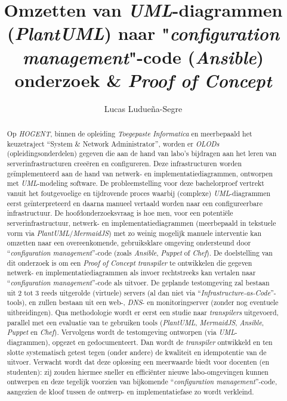 \documentclass{hogent-article}
\title{Omzetten van \emph{UML}-diagrammen (\emph{PlantUML}) naar "\emph{configuration management}"-code (\emph{Ansible})\\\textemdash\space onderzoek \& \emph{Proof of Concept}}
\author{Lucas Ludueña-Segre}
\begin{document}
\begin{abstract}
  Op \emph{HOGENT}, binnen de opleiding \emph{Toegepaste Informatica} en meerbepaald het keuzetraject ``System \& Network Administrator'', worden er \emph{OLODs} (opleidingsonderdelen) gegeven die aan de hand van labo's bijdragen aan het leren van serverinfrastructuren creeëren en configureren. Deze infrastructuren worden geïmplementeerd aan de hand van netwerk- en implementatiediagrammen, ontworpen met \emph{UML}-modeling software. %
  De probleemstelling voor deze bachelorproef vertrekt vanuit het foutgevoelige en tijdrovende proces waarbij (complexe) \emph{UML}-diagrammen eerst geïnterpreteerd en daarna manueel vertaald worden naar een configureerbare infrastructuur.
  De hoofdonderzoeksvraag is hoe men, voor een potentiële serverinfrastructuur, netwerk- en implementatiediagrammen (meerbepaald in tekstuele vorm via \emph{PlantUML}/\emph{MermaidJS}) met zo weinig mogelijk manuele interventie kan omzetten naar een overeenkomende, gebruiksklare omgeving ondersteund door ``\emph{configuration management}''-code (zoals \emph{Ansible}, \emph{Puppet} of \emph{Chef}).
  De doelstelling van dit onderzoek is om een \emph{Proof of Concept} \emph{transpiler} te ontwikkelen die gegeven netwerk- en implementatiediagrammen als invoer rechtstreeks kan vertalen naar ``\emph{configuration management}''-code als uitvoer.
  De geplande testomgeving zal bestaan uit 2 tot 3 reeds uitgerolde (virtuele) servers (al dan niet via ``\emph{Infrastructure-as-Code}''-tools), en zullen bestaan uit een web-, \emph{DNS}- en monitoringserver (zonder nog eventuele uitbreidingen).
  Qua methodologie wordt er eerst een studie naar \emph{transpilers} uitgevoerd, parallel met een evaluatie van te gebruiken tools (\emph{PlantUML}, \emph{MermaidJS}, \emph{Ansible}, \emph{Puppet} en \emph{Chef}). Vervolgens wordt de testomgeving ontworpen (via \emph{UML}-diagrammen), opgezet en gedocumenteert. Dan wordt de \emph{transpiler} ontwikkeld en ten slotte systematisch getest tegen (onder andere) de kwaliteit en idempotentie van de uitvoer.
  Verwacht wordt dat deze oplossing een meerwaarde biedt voor docenten (en studenten): zij zouden hiermee sneller en efficiënter nieuwe labo-omgevingen kunnen ontwerpen en deze tegelijk voorzien van bijkomende ``\emph{configuration management}''-code, aangezien de kloof tussen de ontwerp- en implementatiefase zo wordt verkleind.

\end{abstract}

\tableofcontents



\printbibliography[heading=bibintoc]
\end{document}
